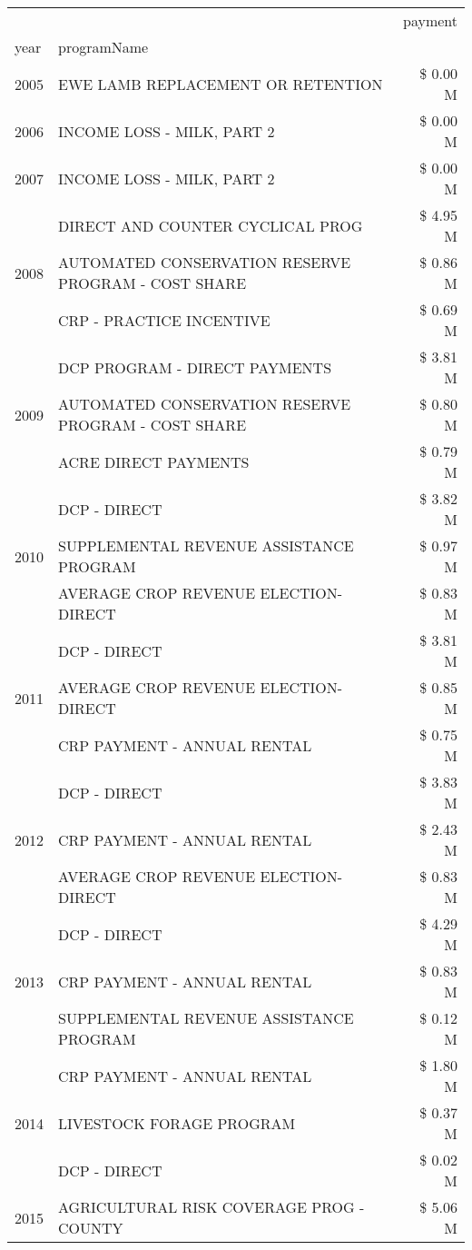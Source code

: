 \begin{tabular}{llr}
\toprule
 &  & payment \\
year & programName &  \\
\midrule
2005 & EWE LAMB REPLACEMENT OR RETENTION & \$ 0.00 M \\
\cline{1-3}
2006 & INCOME LOSS - MILK, PART 2 & \$ 0.00 M \\
\cline{1-3}
2007 & INCOME LOSS - MILK, PART 2 & \$ 0.00 M \\
\cline{1-3}
\multirow[t]{3}{*}{2008} & DIRECT AND COUNTER CYCLICAL PROG & \$ 4.95 M \\
 & AUTOMATED CONSERVATION RESERVE PROGRAM - COST SHARE & \$ 0.86 M \\
 & CRP - PRACTICE INCENTIVE & \$ 0.69 M \\
\cline{1-3}
\multirow[t]{3}{*}{2009} & DCP PROGRAM - DIRECT PAYMENTS & \$ 3.81 M \\
 & AUTOMATED CONSERVATION RESERVE PROGRAM - COST SHARE & \$ 0.80 M \\
 & ACRE DIRECT PAYMENTS & \$ 0.79 M \\
\cline{1-3}
\multirow[t]{3}{*}{2010} & DCP - DIRECT & \$ 3.82 M \\
 & SUPPLEMENTAL REVENUE ASSISTANCE PROGRAM & \$ 0.97 M \\
 & AVERAGE CROP REVENUE ELECTION-DIRECT & \$ 0.83 M \\
\cline{1-3}
\multirow[t]{3}{*}{2011} & DCP - DIRECT & \$ 3.81 M \\
 & AVERAGE CROP REVENUE ELECTION-DIRECT & \$ 0.85 M \\
 & CRP PAYMENT - ANNUAL RENTAL & \$ 0.75 M \\
\cline{1-3}
\multirow[t]{3}{*}{2012} & DCP - DIRECT & \$ 3.83 M \\
 & CRP PAYMENT - ANNUAL RENTAL & \$ 2.43 M \\
 & AVERAGE CROP REVENUE ELECTION-DIRECT & \$ 0.83 M \\
\cline{1-3}
\multirow[t]{3}{*}{2013} & DCP - DIRECT & \$ 4.29 M \\
 & CRP PAYMENT - ANNUAL RENTAL & \$ 0.83 M \\
 & SUPPLEMENTAL REVENUE ASSISTANCE PROGRAM & \$ 0.12 M \\
\cline{1-3}
\multirow[t]{3}{*}{2014} & CRP PAYMENT - ANNUAL RENTAL & \$ 1.80 M \\
 & LIVESTOCK FORAGE PROGRAM & \$ 0.37 M \\
 & DCP - DIRECT & \$ 0.02 M \\
\cline{1-3}
\multirow[t]{3}{*}{2015} & AGRICULTURAL RISK COVERAGE PROG - COUNTY & \$ 5.06 M \\

\end{tabular}
